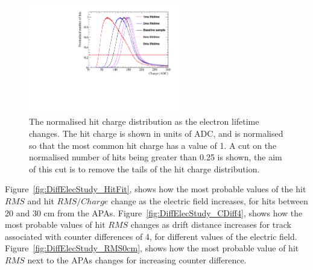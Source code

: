 \begin{figure}[h!]
  \centering
  \includegraphics[width=0.6\textwidth]{Canvas_ChargeCut_ElecLifetime}
  \caption[The normalised hit charge distribution as the electron lifetime changes]
          {The normalised hit charge distribution as the electron lifetime changes. The hit charge is shown in units of ADC, and is normalised so that the most common hit charge has a value of 1. A cut on the normalised number of hits being greater than 0.25 is shown, the aim of this cut is to remove the tails of the hit charge distribution.}
  \label{fig:DiffLifeStudy_ChargeCut}
\end{figure}

Figure~\ref{fig:DiffElecStudy_HitFit}, shows how the most probable values of the hit $RMS$ and hit $RMS/Charge$ change as the electric field increases, for hits between 20 and 30 cm from the APAs. Figure~\ref{fig:DiffElecStudy_CDiff4}, shows how the most probable values of hit $RMS$ changes as drift distance increases for track associated with counter differences of 4, for different values of the electric field. Figure~\ref{fig:DiffElecStudy_RMS0cm}, shows how the most probable value of hit $RMS$ next to the APAs changes for increasing counter difference. \\

